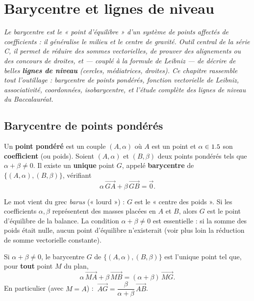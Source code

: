 \chapter{Barycentre et lignes de niveau}

\noindent\textit{Le barycentre est le « point d'équilibre » d'un système de points affectés
de coefficients : il généralise le milieu et le centre de gravité. Outil central de la série C,
il permet de réduire des sommes vectorielles, de prouver des alignements ou des concours de
droites, et — couplé à la formule de Leibniz — de décrire de belles \textbf{lignes de niveau}
(cercles, médiatrices, droites). Ce chapitre rassemble tout l'outillage : barycentre de
points pondérés, fonction vectorielle de Leibniz, associativité, coordonnées, isobarycentre,
et l'étude complète des lignes de niveau du Baccalauréat.}
\vspace{8pt}

\section{Barycentre de points pondérés}

\begin{definition}
Un \textbf{point pondéré} est un couple $(A,\alpha)$ où $A$ est un point et $\alpha\in1.5$ son \textbf{coefficient} (ou poids). Soient $(A,\alpha)$ et $(B,\beta)$ deux points pondérés tels que $\alpha+\beta\neq0$. Il existe un \textbf{unique} point $G$, appelé \textbf{barycentre} de $\{(A,\alpha),(B,\beta)\}$, vérifiant
\[
\alpha\,\overrightarrow{GA}+\beta\,\overrightarrow{GB}=\vec 0.
\]
\end{definition}

\begin{remarque}
Le mot vient du grec \emph{barus} (« lourd ») : $G$ est le « centre des poids ». Si les
coefficients $\alpha,\beta$ représentent des masses placées en $A$ et $B$, alors $G$ est le
point d'équilibre de la balance. La condition $\alpha+\beta\neq0$ est essentielle : si la
somme des poids était nulle, aucun point d'équilibre n'existerait (voir plus loin la réduction
de somme vectorielle constante).
\end{remarque}

\begin{theoreme}
Si $\alpha+\beta\neq0$, le barycentre $G$ de $\{(A,\alpha),(B,\beta)\}$ est l'unique point tel que, pour \textbf{tout} point $M$ du plan,
\[
\alpha\,\overrightarrow{MA}+\beta\,\overrightarrow{MB}=(\alpha+\beta)\,\overrightarrow{MG}.
\]
En particulier (avec $M=A$) : $\ \overrightarrow{AG}=\dfrac{\beta}{\alpha+\beta}\,\overrightarrow{AB}$.
\end{theoreme}

